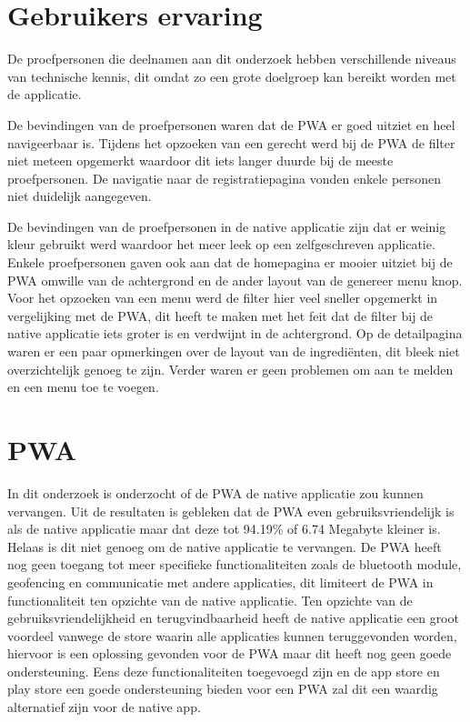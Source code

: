 \section{Gebruikers ervaring}
De proefpersonen die deelnamen aan dit onderzoek hebben verschillende niveaus van technische kennis, dit omdat zo een grote doelgroep kan bereikt worden met de applicatie.

De bevindingen van de proefpersonen waren dat de PWA er goed uitziet en heel navigeerbaar is. Tijdens het opzoeken van een gerecht werd bij de PWA de filter niet meteen opgemerkt waardoor dit iets langer duurde bij de meeste proefpersonen. De navigatie naar de registratiepagina vonden enkele personen niet duidelijk aangegeven.

De bevindingen van de proefpersonen in de native applicatie zijn dat er weinig kleur gebruikt werd waardoor het meer leek op een zelfgeschreven applicatie. Enkele proefpersonen gaven ook aan dat de homepagina er mooier uitziet bij de PWA omwille van de achtergrond en de ander layout van de genereer menu knop. Voor het opzoeken van een menu werd de filter hier veel sneller opgemerkt in vergelijking met de PWA, dit heeft te maken met het feit dat de filter bij de native applicatie iets groter is en verdwijnt in de achtergrond. Op de detailpagina waren er een paar opmerkingen over de layout van de ingrediënten, dit bleek niet overzichtelijk genoeg te zijn. Verder waren er geen problemen om aan te melden en een menu toe te voegen.

\section{PWA}
In dit onderzoek is onderzocht of de PWA de native applicatie zou kunnen vervangen. Uit de resultaten is gebleken dat de PWA even gebruiksvriendelijk is als de native applicatie maar dat deze tot 94.19\% of 6.74 Megabyte kleiner is. Helaas is dit niet genoeg om de native applicatie te vervangen. De PWA heeft nog geen toegang tot meer specifieke functionaliteiten zoals de bluetooth module, geofencing en communicatie met andere applicaties, dit limiteert de PWA in functionaliteit ten opzichte van de native applicatie. Ten opzichte van de gebruiksvriendelijkheid en terugvindbaarheid heeft de native applicatie een groot voordeel vanwege de store waarin alle applicaties kunnen teruggevonden worden, hiervoor is een oplossing gevonden voor de PWA maar dit heeft nog geen goede ondersteuning.
Eens deze functionaliteiten toegevoegd zijn en de app store en play store een goede ondersteuning bieden voor een PWA zal dit een waardig alternatief zijn voor de native app.
